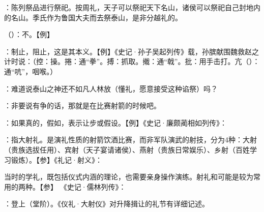 {
\item {}：陈列祭品进行祭祀。按周礼，天子可以祭祀天下名山，诸侯可以祭祀自己封地内的名山。季氏作为鲁国大夫而去祭泰山，是非分越礼的。
\item {}（）：不。【例】 
\item {}：制止，阻止，这是其本义。【例】《史记·孙子吴起列传》载，孙膑献围魏救赵之计时说：（控：操。捲：通“拳”。搏：抓取。撠：通“戟”。批：用手击打。亢（）：通“吭”，咽喉。）%
\item {}：难道说泰山之神还不如凡人林放（懂礼，愿意接受这种谄祭）吗？
}
{}


{
\item {}：非要说有争的话，那就是在比赛射箭的时候吧。

：如果真的，假如，表示让步或假设。【例】《史记·廉颇蔺相如列传》：

：指大射礼。是演礼性质的射箭饮酒比赛，而非军队演武的射技，分为4种：大射（贵族选拔任用）、宾射（天子宴请诸侯）、燕射（贵族日常娱乐）、乡射（百姓学习锻炼）。【参】《礼记·射义》：

当时的学礼，既包括仪式内涵的理论，也需要亲身操作演练。射礼和可能是较为常用的两种。【参】 《史记·儒林列传》：
\item {}：登上（堂阶）。《仪礼·大射仪》对升降揖让的礼节有详细记述。
}
{}


